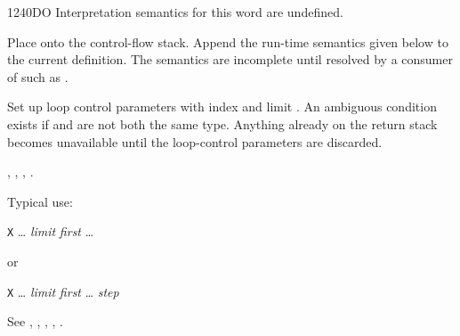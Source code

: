 \begin{worddef}{1240}{DO}
\interpret
	Interpretation semantics for this word are undefined.

\compile

	Place  onto the control-flow stack. Append the
	run-time semantics given below to the current definition. The
	semantics are incomplete until resolved by a consumer of
	 such as .

\runtime

	Set up loop control parameters with index  and
	limit . An ambiguous condition exists if
	 and  are not both the same
	type. Anything already on the return stack becomes unavailable
	until the loop-control parameters are discarded.

\see {},
	,
	,
	.

	\begin{rationale} %
		Typical use:

		\tab \word{:} \texttt{X} {\ldots}
			\emph{limit} \emph{first} 
				{\ldots}
		\word{;}

		or

		\tab \word{:} \texttt{X} {\ldots}
			\emph{limit} \emph{first} 
				{\ldots}
			\emph{step} 
		\word{;}
	\end{rationale}

	\begin{testing} %
		See ,
			,
			,
			,
			.
	\end{testing}
\end{worddef}


